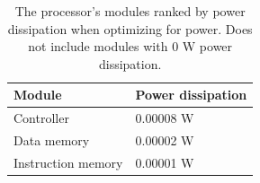 \documentclass[a4paper,11pt]{article}
\begin{document}
\begin{appendix}
\begin{table}[h!]
\centering
\begin{tabular}{|l|l|} \hline
  \textbf{Module} & \textbf{Power dissipation}\\ \hline
  Controller & 0.00008 W \\
  Data memory & 0.00002 W \\ 
  Instruction memory & 0.00001 W \\ \hline
\end{tabular}
\caption{The processor's modules ranked by power dissipation when optimizing for power. Does not include modules with 0 W power dissipation.}
\label{tab:power_rank_pow}
\end{table}

\end{appendix}
\end{document}

